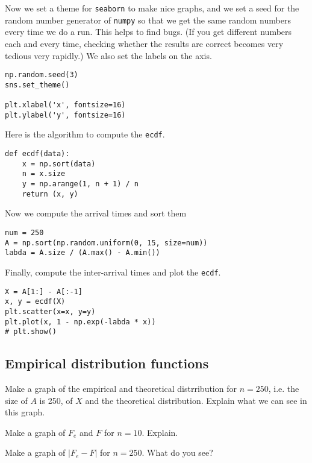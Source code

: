 \documentclass[assignments]{subfiles}
\begin{document}
Now we set a theme for \texttt{seaborn} to make nice graphs, and we set a seed for the random number generator of \texttt{numpy} so that we get the same random numbers every time we do a run.
This helps to find bugs.
(If you get different numbers each and every time, checking whether the results are correct becomes very tedious very rapidly.)
We also set the labels on the axis.

\begin{verbatim}
np.random.seed(3)
sns.set_theme()

plt.xlabel('x', fontsize=16)
plt.ylabel('y', fontsize=16)
\end{verbatim}


Here is the algorithm to compute the \texttt{ecdf}.
\begin{verbatim}
def ecdf(data):
    x = np.sort(data)
    n = x.size
    y = np.arange(1, n + 1) / n
    return (x, y)
\end{verbatim}

Now we compute the arrival times and sort them

\begin{verbatim}
num = 250
A = np.sort(np.random.uniform(0, 15, size=num))
labda = A.size / (A.max() - A.min()) 
\end{verbatim}

Finally, compute the inter-arrival times and plot the \texttt{ecdf}.
\begin{verbatim}
X = A[1:] - A[:-1]
x, y = ecdf(X)
plt.scatter(x=x, y=y)
plt.plot(x, 1 - np.exp(-labda * x))
# plt.show()

\end{verbatim}


\subsection{Empirical distribution functions}
\label{sec:org27b4ea4}
\begin{exercise}
Make a graph of the empirical and theoretical distrribution for $n=250$, i.e. the size of $A$ is 250, of $X$ and the theoretical distribution. Explain what we can see in this graph. 
\end{exercise}

\begin{exercise}
Make a graph of $F_e$ and $F$  for $n=10$. Explain. 
\end{exercise}

\begin{exercise}
Make a graph of  $|F_e - F|$  for $n=250$. What do you see?
\end{exercise}
\end{document}
